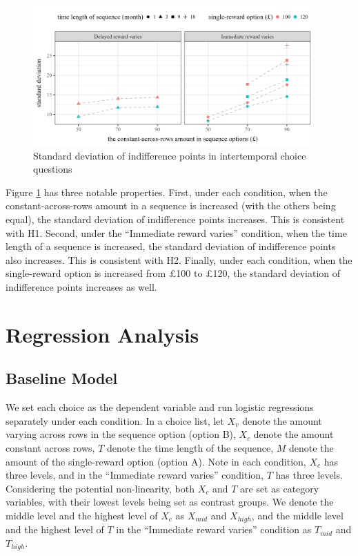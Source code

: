 \documentclass[
  12pt,
]{article}
\begin{document}
\begin{figure}
  \centering
  \includegraphics[width=0.96\textwidth]{figures/fig_switch_sd.png}
  \caption{Standard deviation of indifference points in intertemporal choice questions}
  \label{fig:choice-sd}
\end{figure}

Figure \ref{fig:choice-sd} has three notable properties. First, under
each condition, when the constant-across-rows amount in a sequence is
increased (with the others being equal), the standard deviation of
indifference points increases. This is consistent with H1. Second, under
the ``Immediate reward varies'' condition, when the time length of a
sequence is increased, the standard deviation of indifference points
also increases. This is consistent with H2. Finally, under each
condition, when the single-reward option is increased from £100 to £120,
the standard deviation of indifference points increases as well.

\hypertarget{regression-analysis}{%
\section{Regression Analysis}\label{regression-analysis}}

\hypertarget{baseline-model}{%
\subsection{Baseline Model}\label{baseline-model}}

We set each choice as the dependent variable and run logistic
regressions separately under each condition. In a choice list, let
\(X_v\) denote the amount varying across rows in the sequence option
(option B), \(X_c\) denote the amount constant across rows, \(T\) denote
the time length of the sequence, \(M\) denote the amount of the
single-reward option (option A). Note in each condition, \(X_c\) has
three levels, and in the ``Immediate reward varies'' condition, \(T\)
has three levels. Considering the potential non-linearity, both \(X_c\)
and \(T\) are set as category variables, with their lowest levels being
set as contrast groups. We denote the middle level and the highest level
of \(X_c\) as \(X_{mid}\) and \(X_{high}\), and the middle level and the
highest level of \(T\) in the ``Immediate reward varies'' condition as
\(T_{mid}\) and \(T_{high}\).
\end{document}
